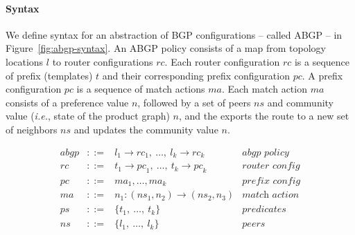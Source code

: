 \documentclass[twocolumn]{sig-alternate-10pt}
\newcommand{\IE}{\emph{i.e.}}
\newcommand{\para}[1]{\paragraph*{\textbf{#1}}}
\begin{document}
\para{Syntax}

We define syntax for an abstraction of BGP configurations -- called ABGP -- in Figure~\ref{fig:abgp-syntax}. An ABGP policy consists of a map from topology locations $l$ to router configurations $rc$. Each router configuration $rc$ is a sequence of prefix (templates) $t$ and their corresponding prefix configuration $pc$. A prefix configuration $pc$ is a sequence of match actions $ma$. Each match action $ma$ consists of a preference value $n$, followed by a set of peers $ns$ and community value (\IE, state of the product graph) $n$, and the exports the route to a new set of neighbors $ns$ and updates the community value $n$.

\vspace{2em}
\begin{figure}[h!]\small

  \hrulefill%
  \vspace{1em}

  \begin{minipage}[t]{.5\linewidth}
  \vspace*{-1\baselineskip}
  \[ \begin{array}{rclr}
     abgp &::=& l_1 \rightarrow {rc}_1, ~\dots,~ l_k \rightarrow {rc}_k & \textit{abgp policy} \\
     rc   &::=& t_1 \rightarrow {pc}_1, ~\dots,~ t_k \rightarrow {pc}_k & \textit{router config} \\
     pc   &::=& ma_1, \dots, ma_k & \textit{prefix config} \\
     ma   &::=& n_1 : ({ns}_1, n_2) \rightarrow ({ns}_2, n_3) & \textit{match action} \\
     ps   &::=& \{ t_1, ~\dots,~ t_k \} & \textit{predicates} \\
     ns   &::=& \{ l_1, ~\dots,~ l_k \} & \textit{peers} \\
  \end{array} \]%


\end{minipage}
\end{figure}
\end{document}
